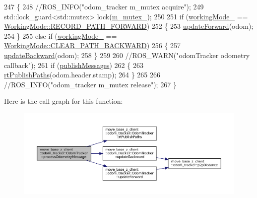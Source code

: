 \begin{DoxyCode}
247 \{
248     \textcolor{comment}{//ROS\_INFO("odom\_tracker m\_mutex acquire");}
249     std::lock\_guard<std::mutex> lock(\hyperlink{classmove__base__z__client_1_1odom__tracker_1_1OdomTracker_a63676e03be48b18ac48d5e2f11f19a25}{m\_mutex\_});
250 
251     \textcolor{keywordflow}{if} (\hyperlink{classmove__base__z__client_1_1odom__tracker_1_1OdomTracker_a39c97d7bf6003fde62e0bed1a221e3f0}{workingMode\_} == \hyperlink{namespacemove__base__z__client_1_1odom__tracker_adf3e5fc3644563922cc64a20a0197224a989d06a586bcf9520889228da7faa643}{WorkingMode::RECORD\_PATH\_FORWARD})
252     \{
253         \hyperlink{classmove__base__z__client_1_1odom__tracker_1_1OdomTracker_a12cee73239bc7685c645f8f52859b61f}{updateForward}(odom);
254     \}
255     \textcolor{keywordflow}{else} \textcolor{keywordflow}{if} (\hyperlink{classmove__base__z__client_1_1odom__tracker_1_1OdomTracker_a39c97d7bf6003fde62e0bed1a221e3f0}{workingMode\_} == \hyperlink{namespacemove__base__z__client_1_1odom__tracker_adf3e5fc3644563922cc64a20a0197224a0cf8f27617189e35619df3c18bda6274}{WorkingMode::CLEAR\_PATH\_BACKWARD})
256     \{
257         \hyperlink{classmove__base__z__client_1_1odom__tracker_1_1OdomTracker_ae613af99d85a8aa18c632e76efe41113}{updateBackward}(odom);
258     \}
259 
260     \textcolor{comment}{//ROS\_WARN("odomTracker odometry callback");}
261     \textcolor{keywordflow}{if} (\hyperlink{classmove__base__z__client_1_1odom__tracker_1_1OdomTracker_a7fa39bb2ddd9e60778687c854ea0c59c}{publishMessages})
262     \{
263         \hyperlink{classmove__base__z__client_1_1odom__tracker_1_1OdomTracker_a6ee06474c7aea4423a7937c8ebc193ad}{rtPublishPaths}(odom.header.stamp);
264     \}
265 
266     \textcolor{comment}{//ROS\_INFO("odom\_tracker m\_mutex release");}
267 \}
\end{DoxyCode}
Here is the call graph for this function\+:
\nopagebreak
\begin{figure}[H]
\begin{center}
\leavevmode
\includegraphics[width=350pt]{classmove__base__z__client_1_1odom__tracker_1_1OdomTracker_a79b9f1e3b15fa6ac82dd93ab78e23579_cgraph}
\end{center}
\end{figure}
